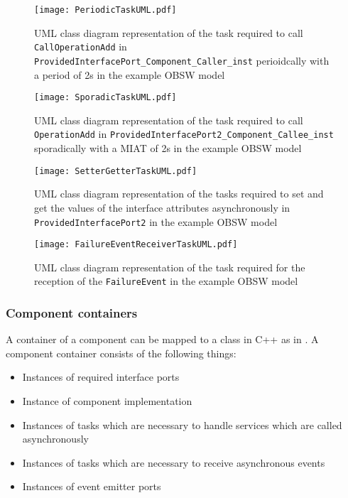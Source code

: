 \begin{figure}[h]
	\centering
	\texttt{[image: PeriodicTaskUML.pdf]}
	\caption{UML class diagram representation of the task required to call \texttt{CallOperationAdd} in \texttt{Provided\allowbreak Interface\allowbreak Port\allowbreak\_Component\allowbreak\_Caller\allowbreak\_inst} perioidcally with a period of 2s in the example OBSW model}
	\label{fig: Periodic task UML}
\end{figure}

\begin{figure}[h]
	\centering
	\texttt{[image: SporadicTaskUML.pdf]}
	\caption{UML class diagram representation of the task required to call \texttt{OperationAdd} in \texttt{Provided\allowbreak Interface\allowbreak Port2\allowbreak\_Component\allowbreak\_Callee\allowbreak\_inst} sporadically with a MIAT of 2s in the example OBSW model}
	\label{fig: Sporadic task UML}
\end{figure}

\begin{figure}[h]
	\centering
	\texttt{[image: SetterGetterTaskUML.pdf]}
	\caption{UML class diagram representation of the tasks required to set and get the values of the interface attributes asynchronously in \texttt{Provided\allowbreak Interface\allowbreak Port2} in the example OBSW model}
	\label{fig: Status value getter setter task UML}
\end{figure}

\begin{figure}[h]
	\centering
	\texttt{[image: FailureEventReceiverTaskUML.pdf]}
	\caption{UML class diagram representation of the task required for the reception of the \texttt{Failure\allowbreak Event} in the example OBSW model}
	\label{fig: Event receiver task UML}
\end{figure}

\subsubsection{\textbf{Component containers}}
A container of a component can be mapped to a class in C++ as in \cite{EvoRAVCodeAr}. A component container consists of the following things:

\begin{itemize}
\item Instances of required interface ports
\item Instance of component implementation 
\item Instances of tasks which are necessary to handle services which are called asynchronously 
\item Instances of tasks which are necessary to receive asynchronous events
\item Instances of event emitter ports
\end{itemize}

